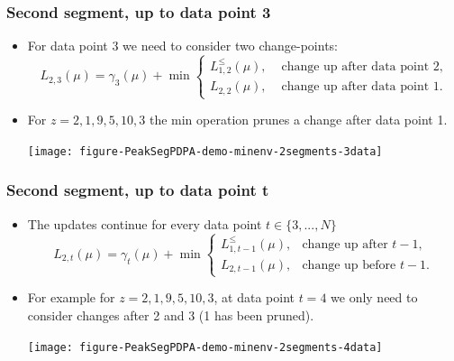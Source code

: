 \documentclass{beamer}
\begin{document}
 
\begin{frame}[fragile]
  \frametitle{Second segment, up to data point 3}
  \begin{itemize}
  \item For data point 3 we need to consider two change-points:
    \begin{equation*}
      L_{2,3}(\mu) =  \gamma_3(\mu) + \min
      \begin{cases}
        L_{1,2}^{\leq}(\mu), & \text{ change up after data point 2},\\
        L_{2,2}(\mu), & \text{ change up after data point 1}. 
      \end{cases}
    \end{equation*}
  \item For $z = 2, 1, 9, 5, 10, 3$ the min operation prunes a
    change after data point 1.
    \begin{center}
      \texttt{[image: figure-PeakSegPDPA-demo-minenv-2segments-3data]}
    \end{center}
  \end{itemize}
\end{frame}

\begin{frame}
  \frametitle{Second segment, up to data point t}
  \begin{itemize}
  \item The updates continue for every data point $t\in\{3, ..., N\}$
    \begin{equation*}
      L_{2,t}(\mu) =  \gamma_t(\mu) + \min
      \begin{cases}
        L_{1,t-1}^{\leq}(\mu), & \text{change up after $t-1$,}\\
        L_{2,t-1}(\mu), & \text{change up before $t-1$.}
      \end{cases}
    \end{equation*}
  \item For example for $z = 2, 1, 9, 5, 10, 3$, at data point $t=4$
    we only need to consider changes after 2 and 3 (1 has been
    pruned).
    \begin{center}
      \texttt{[image: figure-PeakSegPDPA-demo-minenv-2segments-4data]}
    \end{center}
  \end{itemize}
\end{frame}
\end{document}
